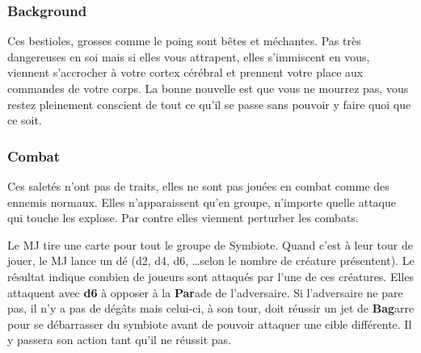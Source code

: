 \subsubsection{Background}
Ces bestioles, grosses comme le poing sont bêtes et méchantes. Pas très dangereuses en soi mais si elles vous attrapent, elles s’immiscent en vous, viennent s’accrocher à votre cortex cérébral et prennent votre place aux commandes de votre corps. La bonne nouvelle est que vous ne mourrez pas, vous restez pleinement conscient de tout ce qu’il se passe sans pouvoir y faire quoi que ce soit.

\subsubsection{Combat}
Ces saletés n’ont pas de traits, elles ne sont pas jouées en combat comme des ennemis normaux. Elles n’apparaissent qu’en groupe, n’importe quelle attaque qui touche les explose. Par contre elles viennent perturber les combats.

Le MJ tire une carte pour tout le groupe de Symbiote. Quand c’est à leur tour de jouer, le MJ lance un dé (d2, d4, d6, \dots selon le nombre de créature présentent). Le résultat indique combien de joueurs sont attaqués par l’une de ces créatures. Elles attaquent avec \textbf{d6} à opposer à la \textbf{Par}ade de l’adversaire. Si l’adversaire ne pare pas, il n’y a pas de dégâts mais celui-ci, à son tour, doit réussir un jet de \textbf{Bag}arre pour se débarrasser du symbiote avant de pouvoir attaquer une cible différente. Il y passera son action tant qu’il ne réussit pas.
